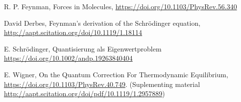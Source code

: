 \item
  R. P. Feynman,
  Forces in Molecules,
  \url{https://doi.org/10.1103/PhysRev.56.340}
\item
  David Derbes,
  Feynman’s derivation of the Schrödinger equation,
  \url{http://aapt.scitation.org/doi/10.1119/1.18114}
\item
  E. Schrödinger,
  Quantisierung als Eigenwertproblem
  \url{https://doi.org/10.1002/andp.19263840404}

\item
  E. Wigner,
  On the Quantum Correction For Thermodynamic Equilibrium,
  \url{https://doi.org/10.1103/PhysRev.40.749}.
  (Suplementing material \url{http://aapt.scitation.org/doi/pdf/10.1119/1.2957889})

